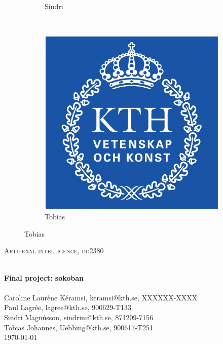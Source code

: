 \documentclass[a4paper,10pt]{article}
\begin{document}
\begin{titlepage}
\begin{center}
\begin{figure}[h]
\begin{subfigure}[b]{0.2\textwidth}
                \caption{Sindri}
                \label{fig:Sindri}
        \end{subfigure}
          ~ %
        \begin{subfigure}[b]{0.2\textwidth}
                \centering
                \includegraphics[width=\textwidth]{kth_mathematics_rgb.jpg}
                \caption{Tobias}
                \label{fig:Tobias}
        \end{subfigure}
\end{figure}

\textsc{\Large Artificial intelligence, dd2380 }  %

\hrulefill \\[0.4cm]
{ \huge \bfseries Final project: sokoban}\\[0.4cm]
\hrulefill \\[1.5cm]



    Caroline Laurène Kéramsi, keramsi@kth.se, XXXXXX-XXXX \\
    Paul Lagrée, lagree@kth.se, 900629-T133 \\
    Sindri Magnússon, sindrim@kth.se, 871209-7156 \\
    Tobias Johannes, Uebbing@kth.se, 900617-T251 \\


\vfill
{\large \today}

\end{center}
\end{titlepage}
\end{document}
